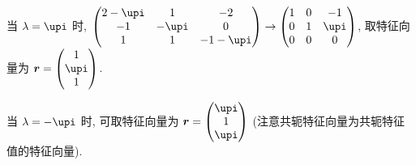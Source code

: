 \begin{solution}
  当 $\lambda=\upi$ 时, $\begin{pmatrix}2-\upi&1&-2\\-1&-\upi&0\\1&1&-1-\upi\end{pmatrix}\to\begin{pmatrix}1&0&-1\\0&1&\upi\\0&0&0\end{pmatrix}$, 
  取特征向量为 $\bm{r}=\begin{pmatrix}1\\\upi\\1\end{pmatrix}$.

  当 $\lambda=-\upi$ 时, 可取特征向量为 $\bm{r}=\begin{pmatrix}\upi\\1\\\upi\end{pmatrix}$
  (注意共轭特征向量为共轭特征值的特征向量).


\end{solution}
